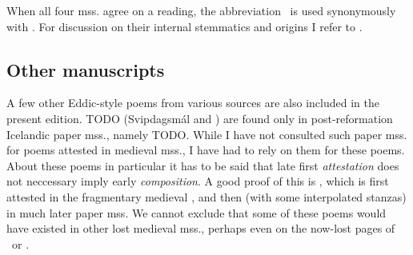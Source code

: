When all four mss. agree on a reading, the abbreviation \GylfMS\ is used synonymously with \RegiusProse\Trajectinus\Wormianus\Upsaliensis.  For discussion on their internal stemmatics and origins I refer to \textcite{Haukur2017}.

\subsection{Other manuscripts}

A few other Eddic-style poems from various sources are also included in the present edition.  TODO (Svipdagsmál and \Grougaldr) are found only in post-reformation Icelandic paper mss., namely TODO.  While I have not consulted such paper mss. for poems attested in medieval mss., I have had to rely on them for these poems.  About these poems in particular it has to be said that late first \emph{attestation} does not neccessary imply early \emph{composition}.  A good proof of this is \Baldrsdraumar, which is first attested in the fragmentary medieval \AM, and then (with some interpolated stanzas) in much later paper mss.  We cannot exclude that some of these poems would have existed in other lost medieval mss., perhaps even on the now-lost pages of \Regius\ or \AM.

